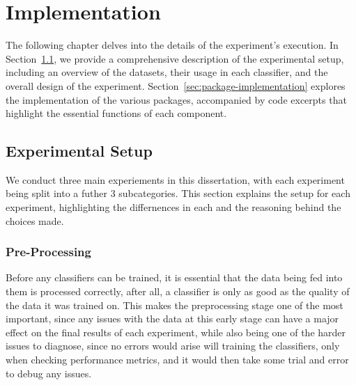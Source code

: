 \chapter{Implementation}

The following chapter delves into the details of the experiment's execution. In Section~\ref{sec:experimental-setup}, we provide a comprehensive description of the experimental setup, including an overview of the datasets, their usage in each classifier, and the overall design of the experiment. Section~\ref{sec:package-implementation} explores the implementation of the various packages, accompanied by code excerpts that highlight the essential functions of each component.

\section{Experimental Setup}\label{sec:experimental-setup}

We conduct three main experiements in this dissertation, with each experiment being split into a futher 3 subcategories. This section explains the setup for each experiment, highlighting the differnences in each and the reasoning behind the choices made.

\subsection{Pre-Processing}\label{subsec:pre-processing}

Before any classifiers can be trained, it is essential that the data being fed into them is processed correctly, after all, a classifier is only as good as the quality of the data it was trained on. This makes the preprocessing stage one of the most important, since any issues with the data at this early stage can have a major effect on the final results of each experiment, while also being one of the harder issues to diagnose, since no errors would arise will training the classifiers, only when checking performance metrics, and it would then take some trial and error to debug any issues.


